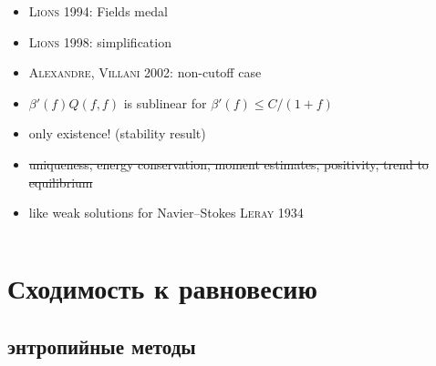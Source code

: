 \documentclass[mathserif]{beamer} %
\newcommand{\Cite}[2][]{\alert{\textsc{#2 #1}}}
\begin{document}
\begin{frame}
\begin{columns}
\begin{column}{0.8\textwidth}
\begin{itemize}
            \item \Cite[1994]{Lions}: Fields medal
            \item \Cite[1998]{Lions}: simplification
            \item \Cite[2002]{Alexandre, Villani}: non-cutoff case
        \end{itemize}
        \vspace{10pt}
        \begin{itemize}
            \item \(\beta'(f)Q(f,f)\) is sublinear for \(\beta'(f) \leq C/(1+f)\)
            \item only existence! (stability result)
            \item \sout{uniqueness, energy conservation, moment estimates, positivity, trend to equilibrium}
            \item like weak solutions for Navier--Stokes \Cite[1934]{Leray}\!\!\!\!\!\!\!\!
        \end{itemize}
    \end{column}
    \end{columns}
\end{frame}

\section{Сходимость к равновесию}

\subsection{энтропийные методы}
\end{document}
